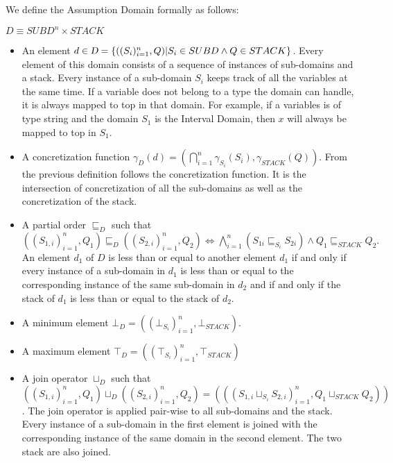 \documentclass[10pt]{report}
\begin{document}
We define the Assumption Domain formally as follows: \\
\begin{center}
	$D \equiv SUBD^{n} \times STACK$\\	
\end{center}
\begin{itemize}
	\item An element $d \in \textsl{D} = \lbrace ((S_{i})_{i=1}^{n}, Q) \vert S_{i} \in SUBD \wedge Q \in STACK \rbrace$. Every element of this domain consists of a sequence of instances of sub-domains and a stack. Every instance of a sub-domain $ S_{i} $ keeps track of all the variables at the same time. If a variable does not belong to a type the domain can handle, it is always mapped to top in that domain. For example, if a variables is of type string and the domain $ S_{1} $ is the Interval Domain, then $ x $ will always be mapped to top in $ S_{1} $.
	\item A concretization function $\gamma_{D}(d) =( \bigcap\limits_{i=1}^{n}\gamma_{S_{i}}(S_{i}), \gamma_{STACK}(Q)).$ From the previous definition follows the concretization function. It is the intersection of concretization of all the sub-domains as well as the concretization of the stack. 
	\item A partial order $\sqsubseteq_{D}$ such that $ ((S_{1,i})_{i=1}^{n}, Q_{1}) \sqsubseteq_{D} ((S_{2, i})_{i=1}^{n}, Q_{2}) \Longleftrightarrow \bigwedge\limits_{i=1}^{n}(S_{1i} \sqsubseteq_{S_{i}} S_{2i}) \wedge Q_{1} \sqsubseteq_{STACK} Q_{2} .$ An element $ d_{1} $ of $ D $ is less than or equal to another element $ d_{1} $ if and only if every instance of a sub-domain in $ d_{1} $ is less than or equal to the corresponding instance of the same sub-domain in $ d_{2} $ and if and only if the stack of $ d_{1} $ is less than or equal to the stack of $ d_{2} $.
	\item A minimum element $\bot_{D} = ((\bot_{S_{i}})_{i=1}^{n}, \bot_{STACK})$.   
	\item A maximum element $\top_{D} =  ((\top_{S_{i}})_{i=1}^{n}, \top_{STACK})$
	\item A join operator $\sqcup_{D}$ such that $ ((S_{1,i})_{i=1}^{n}, Q_{1}) \sqcup_{D} ((S_{2,i})_{i=1}^{n}, Q_{2}) = (((S_{1,i} \sqcup_{S_{i}} S_{2,i})_{i=1}^{n}, Q_{1} \sqcup_{STACK} Q_{2}))$. The join operator is applied pair-wise to all sub-domains and the stack. Every instance of a sub-domain in the first element is joined with the corresponding instance of the same domain in the second element. The two stack are also joined. 

\end{itemize}
\end{document}
